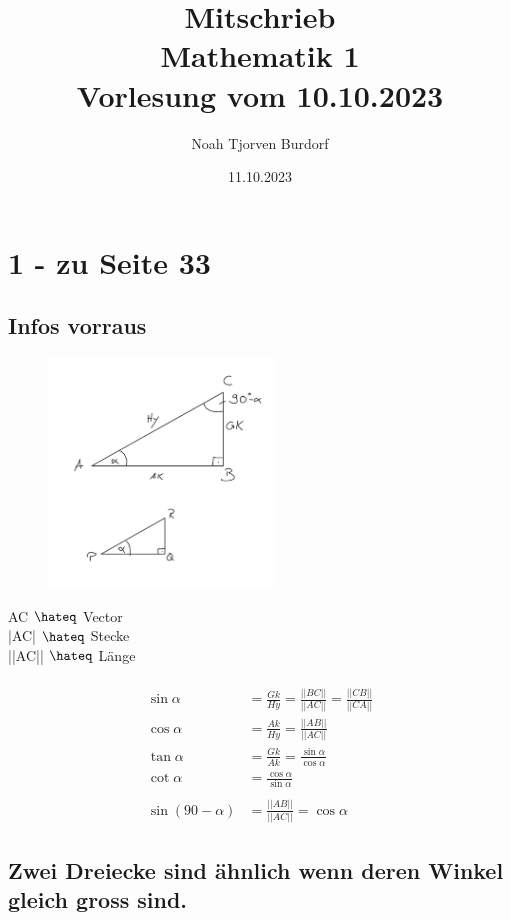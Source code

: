 \documentclass[a4paper,onecolumn,pdftex]{report}
\begin{document}
    \author{Noah Tjorven Burdorf}
    \title{Mitschrieb \\ Mathematik 1 \\ Vorlesung vom 10.10.2023}
    \date{11.10.2023}
    \maketitle

    \section*{1 - zu Seite 33}
    \subsection*{Infos vorraus}
    \begin{figure}
        \includegraphics[width=6cm]{2023-10-10_22h01_07.png}
    \end{figure}
    AC $\hateq$ Vector \\
    |AC| $\hateq$ Stecke \\
    ||AC|| $\hateq$ L\"ange \\\\
    \begin{align*}
        \sin\alpha&=\frac{Gk}{Hy}=\frac{||BC||}{||AC||}=\frac{||CB||}{||CA||} \\
        \cos\alpha&=\frac{Ak}{Hy}=\frac{||AB||}{||AC||} \\
        \tan\alpha&=\frac{Gk}{Ak}=\frac{\sin\alpha}{\cos\alpha} \\
        \cot\alpha&=\frac{\cos\alpha}{\sin\alpha} \\\\
        \sin(90-\alpha) &= \frac{||AB||}{||AC||} = \cos\alpha
    \end{align*}

    \vspace{20px}
    \subsection*{Zwei Dreiecke sind \"ahnlich wenn deren Winkel gleich gross sind.}
    
\end{document}
